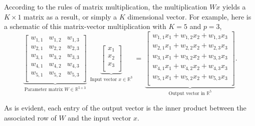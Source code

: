 \documentclass[12pt]{article}
\begin{document}
According to the rules of matrix multiplication, the multiplication $Wx$ yields a $K \times 1$ matrix as a result, or simply a $K$ dimensional vector. For example, here is a schematic of this matrix-vector multiplication with $K = 5$ and $p=3$,
%
\begin{equation}
\label{eq:matrix-vector-mult} 
\underbrace{
\begin{bmatrix}
w_{1,1} & w_{1,2} & w_{1,3}  \\
w_{2,1} & w_{2,2} & w_{2,3}\\
w_{3,1} & w_{3,2} & w_{3,3}\\
w_{4,1} & w_{4,2} & w_{4,3}\\
w_{5,1} & w_{5,2} & w_{5,3}\\
\end{bmatrix}
}
_
{
\textrm{Parameter matrix $W \in {\mathbb R}^{5 \times 3}$}
}
~~
\underbrace{
\begin{bmatrix}
x_1  \\
x_2 \\
x_3 \\
\end{bmatrix}
}
_
{\textrm{Input vector $x \in {\mathbb R}^3$}}
~
=
~
\underbrace{
\begin{bmatrix}
w_{1,1}x_1 + w_{1,2} x_2 + w_{1,3} x_3 \\
w_{2,1}x_1 + w_{2,2} x_2 + w_{2,3} x_3\\
w_{3,1}x_1 + w_{3,2} x_2 + w_{3,3} x_3\\
w_{4,1}x_1 + w_{4,2} x_2 + w_{4,3} x_3\\
w_{5,1}x_1 + w_{5,2} x_2 + w_{5,3} x_3\\
\end{bmatrix}
}
_{
\textrm{Output vector in ${\mathbb R}^5$}
}.
\end{equation}

%
As is evident, each entry of the output vector is the inner product between the associated row of $W$ and the input vector $x$.
\end{document}
